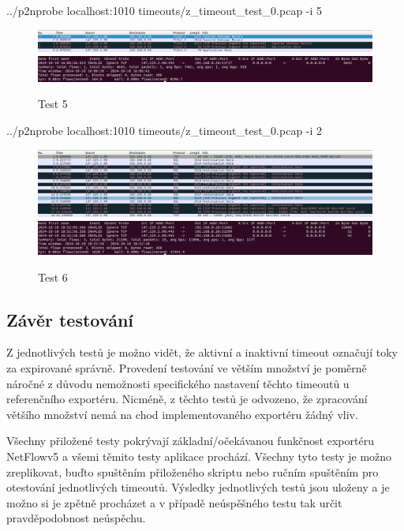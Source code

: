 \documentclass[11pt, a4paper, hidelinks]{article}[08.10.2023]
\begin{document}
    \begin{center}
        ../p2nprobe localhost:1010 timeouts/z\_timeout\_test\_0.pcap -i 5
    \end{center}
    \begin{figure}[ht]
        \centering
        \includegraphics[width=1\linewidth]{pictures/test_5_data.png}
        \includegraphics[width=1\linewidth]{pictures/test_5_res.png}
        \caption{Test 5}
    \end{figure}

    \begin{center}
        ../p2nprobe localhost:1010 timeouts/z\_timeout\_test\_0.pcap -i 2
    \end{center}
    \begin{figure}[ht]
        \centering
        \includegraphics[width=1\linewidth]{pictures/test_6_data.png}
        \includegraphics[width=1\linewidth]{pictures/test_6_res.png}
        \caption{Test 6}
    \end{figure}

    \pagebreak
    \subsection{Závěr testování}
    Z jednotlivých testů je možno vidět, že aktivní a inaktivní timeout označují toky za expirované správně. Provedení testování ve větším množství je poměrně náročné z důvodu nemožnosti specifického nastavení těchto timeoutů u referenčního exportéru. Nicméně, z těchto testů je odvozeno, že zpracování většího množství nemá na chod implementovaného exportéru žádný vliv.

    Všechny přiložené testy pokrývají základní/očekávanou funkčnost exportéru NetFlowv5 a všemi těmito testy aplikace prochází. Všechny tyto testy je možno zreplikovat, buďto spuštěním přiloženého skriptu nebo ručním spuštěním pro otestování jednotlivých timeoutů. Výsledky jednotlivých testů jsou uloženy a je možno si je zpětně procházet a v případě neúspěšného testu tak určit pravděpodobnost neúspěchu.
\end{document}
